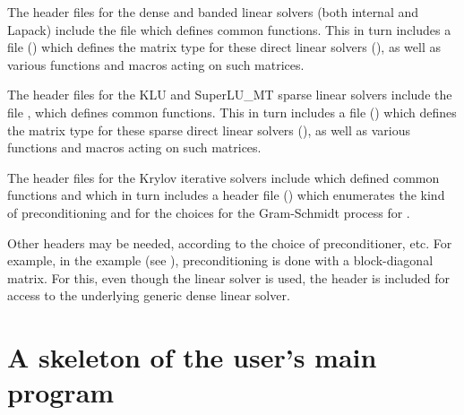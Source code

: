 The header files for the dense and banded linear solvers (both
internal and Lapack) include the file  which
defines common functions.  This in turn includes a file
() which defines the matrix type for these
direct linear solvers (), as well as various functions and
macros acting on such matrices.

The header files for the KLU and SuperLU\_MT sparse linear solvers
include the file , which defines common functions.
This in turn includes a file () which defines
the matrix type for these sparse direct linear solvers (),
as well as various functions and macros acting on such matrices.

The header files for the Krylov iterative solvers include
 which defined common functions and which in turn
includes a header file () which enumerates
the kind of preconditioning and for the choices for the Gram-Schmidt
process for {\spgmr}.

Other headers may be needed, according to the choice of
preconditioner, etc.  For example, in the 
example (see \cite{kinsol_ex}), preconditioning is done with a
block-diagonal matrix. For this, even though the {\kinspgmr} linear
solver is used, the header  is included for
access to the underlying generic dense linear solver.

\section{A skeleton of the user's main program}\label{s:skeleton_sol}

